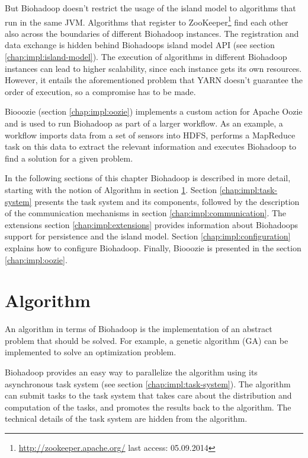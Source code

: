 But Biohadoop doesn't restrict the usage of the island model to algorithms that run in the same JVM. Algorithms that register to ZooKeeper\footnote{\url{http://zookeeper.apache.org/} last access: 05.09.2014} find each other also across the boundaries of different Biohadoop instances. The registration and data exchange is hidden behind Biohadoops island model API (see section \ref{chap:impl:island-model}). The execution of algorithms in different Biohadoop instances can lead to higher scalability, since each instance gets its own resources. However, it entails the aforementioned problem that YARN doesn't guarantee the order of execution, so a compromise has to be made.

Biooozie (section \ref{chap:impl:oozie}) implements a custom action for Apache Oozie and is used to run Biohadoop as part of a larger workflow. As an example, a workflow imports data from a set of sensors into HDFS, performs a MapReduce task on this data to extract the relevant information and executes Biohadoop to find a solution for a given problem.

In the following sections of this chapter Biohadoop is described in more detail, starting with the notion of Algorithm in section \ref{chap:impl:algorithm}. Section \ref{chap:impl:task-system} presents the task system and its components, followed by the description of the communication mechanisms in section \ref{chap:impl:communication}. The extensions section \ref{chap:impl:extensions} provides information about Biohadoops support for persistence and the island model. Section \ref{chap:impl:configuration} explains how to configure Biohadoop. Finally, Biooozie is presented in the section \ref{chap:impl:oozie}.

\section{Algorithm}
\label{chap:impl:algorithm}
An algorithm in terms of Biohadoop is the implementation of an abstract problem that should be solved. For example, a genetic algorithm (GA) can be implemented to solve an optimization problem.

Biohadoop provides an easy way to parallelize the algorithm using its asynchronous task system (see section \ref{chap:impl:task-system}). The algorithm can submit tasks to the task system that takes care about the distribution and computation of the tasks, and promotes the results back to the algorithm. The technical details of the task system are hidden from the algorithm.

